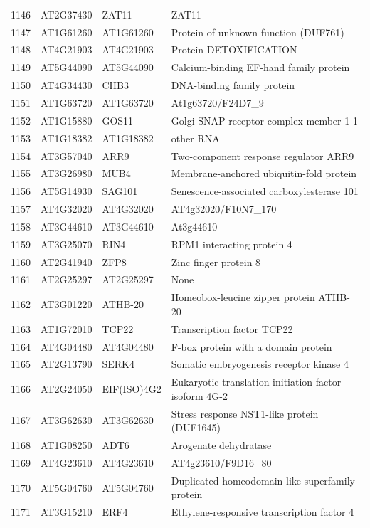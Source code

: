 \documentclass[11pt]{article}
\begin{document}
\begin{center}
\begin{tabular}{rlll}
1146 & AT2G37430 & ZAT11 & ZAT11\\
1147 & AT1G61260 & AT1G61260 & Protein of unknown function (DUF761)\\
1148 & AT4G21903 & AT4G21903 & Protein DETOXIFICATION\\
1149 & AT5G44090 & AT5G44090 & Calcium-binding EF-hand family protein\\
1150 & AT4G34430 & CHB3 & DNA-binding family protein\\
1151 & AT1G63720 & AT1G63720 & At1g63720/F24D7\_9\\
1152 & AT1G15880 & GOS11 & Golgi SNAP receptor complex member 1-1\\
1153 & AT1G18382 & AT1G18382 & other RNA\\
1154 & AT3G57040 & ARR9 & Two-component response regulator ARR9\\
1155 & AT3G26980 & MUB4 & Membrane-anchored ubiquitin-fold protein\\
1156 & AT5G14930 & SAG101 & Senescence-associated carboxylesterase 101\\
1157 & AT4G32020 & AT4G32020 & AT4g32020/F10N7\_170\\
1158 & AT3G44610 & AT3G44610 & At3g44610\\
1159 & AT3G25070 & RIN4 & RPM1 interacting protein 4\\
1160 & AT2G41940 & ZFP8 & Zinc finger protein 8\\
1161 & AT2G25297 & AT2G25297 & None\\
1162 & AT3G01220 & ATHB-20 & Homeobox-leucine zipper protein ATHB-20\\
1163 & AT1G72010 & TCP22 & Transcription factor TCP22\\
1164 & AT4G04480 & AT4G04480 & F-box protein with a domain protein\\
1165 & AT2G13790 & SERK4 & Somatic embryogenesis receptor kinase 4\\
1166 & AT2G24050 & EIF(ISO)4G2 & Eukaryotic translation initiation factor isoform 4G-2\\
1167 & AT3G62630 & AT3G62630 & Stress response NST1-like protein (DUF1645)\\
1168 & AT1G08250 & ADT6 & Arogenate dehydratase\\
1169 & AT4G23610 & AT4G23610 & AT4g23610/F9D16\_80\\
1170 & AT5G04760 & AT5G04760 & Duplicated homeodomain-like superfamily protein\\
1171 & AT3G15210 & ERF4 & Ethylene-responsive transcription factor 4\\

\end{tabular}
\end{center}
\end{document}
